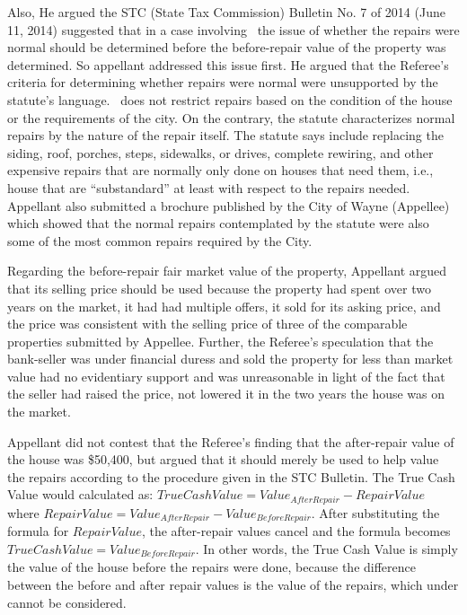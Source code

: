 \documentclass[12pt,\documentclassflag]{michiganCourtOfAppealsBrief}
\def\mathieuGast{\pincite[l]{MCL}{211.27(2)}}
\begin{document}
Also, He argued the STC (State Tax Commission) Bulletin No. 7 of 2014 (June 11, 2014) suggested that in a case involving \mathieuGast\ the issue of whether the repairs were normal should be determined before the before-repair value of the property was determined. So appellant addressed this issue first. He argued that the Referee's criteria for determining whether repairs were normal were unsupported by the statute's language. \mathieuGast\ does not restrict repairs based on the condition of the house or the requirements of the city. On the contrary, the statute characterizes normal repairs by the nature of the repair itself. The statute says include replacing the siding, roof, porches, steps, sidewalks, or drives, complete rewiring, and other expensive repairs that are normally only done on houses that need them, i.e., house that are ``substandard'' at least with respect to the repairs needed. Appellant also submitted a brochure published by the City of Wayne (Appellee) which showed that the normal repairs contemplated by the statute were also some of the most common repairs required by the City. 

Regarding the before-repair fair market value of the property, Appellant argued that its selling price should be used because the property had spent over two years on the market, it had had multiple offers, it sold for its asking price, and the price was consistent with the selling price of three of the comparable properties submitted by Appellee. Further, the Referee's speculation that the bank-seller was under financial duress and sold the property for less than market value had no evidentiary support and was unreasonable in light of the fact that the seller had raised the price, not lowered it in the two years the house was on the market.

Appellant did not contest that the Referee's finding that the after-repair value of the house was \$50,400, but argued that it should merely be used to help value the repairs according to the procedure given in the STC Bulletin. The True Cash Value would calculated as: 
$TrueCashValue = Value_{AfterRepair} - RepairValue$
where $RepairValue = Value_{AfterRepair} - Value_{BeforeRepair}$. After substituting the formula for $RepairValue$, the after-repair values cancel and the formula becomes $TrueCashValue = Value_{BeforeRepair}$. In other words, the True Cash Value is simply the value of the house before the repairs were done, because the difference between the before and after repair values is the value of the repairs, which under  cannot be considered.
\end{document}
